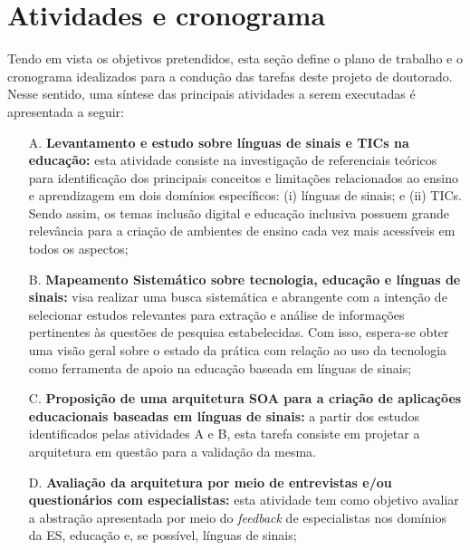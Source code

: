 \section{Atividades e cronograma}

Tendo em vista os objetivos pretendidos, esta seção define o plano de trabalho e o cronograma idealizados para a condução das tarefas deste projeto de doutorado. Nesse sentido, uma síntese das principais atividades a serem executadas é apresentada a seguir:

\begin{enumerate}
    \item [A.]\textbf{Levantamento e estudo sobre línguas de sinais e TICs na educação:} esta atividade consiste na investigação de referenciais teóricos para identificação dos principais conceitos e limitações relacionados ao ensino e aprendizagem em dois domínios específicos: (i) línguas de sinais; e (ii) TICs. Sendo assim, os temas inclusão digital e educação inclusiva possuem grande relevância para a criação de ambientes de ensino cada vez mais acessíveis em todos os aspectos;
    
    \item [B.]\textbf{Mapeamento Sistemático sobre tecnologia, educação e línguas de sinais:} visa realizar uma busca sistemática e abrangente com a intenção de selecionar estudos relevantes para extração e análise de informações pertinentes às questões de pesquisa estabelecidas. Com isso, espera-se obter uma visão geral sobre o estado da prática com relação ao uso da tecnologia como ferramenta de apoio na educação baseada em línguas de sinais;
    
    \item [C.]\textbf{Proposição de uma arquitetura SOA para a criação de aplicações educacionais baseadas em línguas de sinais:} a partir dos estudos identificados pelas atividades A e B, esta tarefa consiste em projetar a arquitetura em questão para a validação da mesma.%
    
    \item [D.]\textbf{Avaliação da arquitetura por meio de entrevistas e/ou questionários com especialistas:} esta atividade tem como objetivo avaliar a abstração apresentada por meio do \textit{feedback} de especialistas nos domínios da ES, educação e, se possível, línguas de sinais;
    

\end{enumerate}
